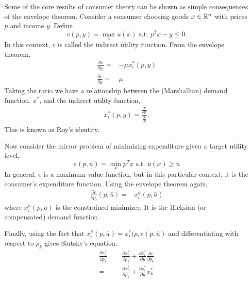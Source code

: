 \begin{example}
  Some of the core results of consumer theory can be shown as simple
  consequences of the envelope theorem. Consider a consumer choosing
  goods $x \in \mathbb{R}^n$ with prices $p$ and income $y$. Define 
  \[ v(p,y) = \max_x u(x) \text{ s.t. } p^T x - y \leq 0. \]
  In this context, $v$ is called the indirect utility function. From
  the envelope theorem,
  \begin{align*}
    \frac{\partial v}{\partial p_i} = & -\mu x_i^*(p,y) \\
    \frac{\partial v}{\partial y} = & \mu
  \end{align*}
  Taking the ratio we have a relationship between the (Marshallian)
  demand function, $x^*$, and the indirect utility function,
  \begin{align*}
    x_i^*(p,y) = \frac{ \frac{\partial v}{\partial p_i}}
    {\frac{\partial v}{\partial y}}.
  \end{align*}
  This is known as Roy's identity.

  Now consider the mirror problem of minimizing expenditure given a
  target utility level,
  \[ e(p,\bar{u}) = \min_x p^T x \text{ s.t. } u(x) \geq \bar{u} \]
  In general, $e$ is a maximum value function, but in this particular
  context, it is the consumer's expenditure function. Using the
  envelope theorem again,
  \begin{align*}
    \frac{\partial e}{\partial p_i}(p,\bar{u}) = & x_i^h(p,\bar{u})
  \end{align*}
  where $x_i^h(p,\bar{u})$ is the constrained minimizer. It is the
  Hicksian (or compensated) demand function.

  Finally, using the fact that $x_i^h(p,\bar{u}) =
  x_i^*(p,e(p,\bar{u})$ and differentiating with respect to $p_k$
  gives Slutsky's equation.
  \begin{align*}
    \frac{\partial x_i^h}{\partial p_k} = & \frac{\partial
      x_i^*}{\partial p_k} + \frac{\partial x_i^*}{\partial y}
    \frac{\partial e}{\partial p_k} \\
    = & \frac{\partial
      x_i^*}{\partial p_k} + \frac{\partial x_i^*}{\partial y}
    x_k^*
  \end{align*}   
\end{example}

